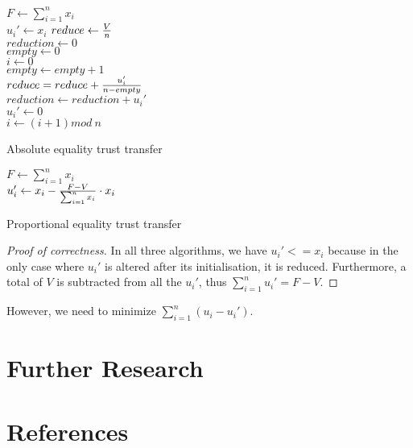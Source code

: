 \documentclass[11pt]{article}
\theoremstyle{definition}
\theoremstyle{corollary}
\begin{document}
    \begin{algorithm}[H]
       $F \gets \sum_{i=1}^{n}x_i$ \\
          {$u_i' \gets x_i$}
       $reduce \gets {V \over n}$ \\
       $reduction \gets 0$ \\
       $empty \gets 0$ \\
       $i \gets 0$ \\
          {
                {$empty \gets empty + 1$ \\
                 $reduce = reduce + {{u_i'} \over {n - empty}}$ \\
                 $reduction \gets reduction + u_i'$ \\
                 $u_i' \gets 0$ \\}
           $i \gets (i + 1) mod \:n$}
       \caption{Absolute equality trust transfer}
    \end{algorithm}

    \begin{algorithm}[H]
       $F \gets \sum_{i=1}^{n}x_i$ \\
          {$u_i' \gets x_i - {{F - V} \over {\sum_{i=1}^{n}x_i}} \cdot x_i$}
       \caption{Proportional equality trust transfer}
    \end{algorithm}
    \begin{proof}[Proof of correctness]
       In all three algorithms, we have $u_i' <= x_i$ because in the only case where $u_i'$ is altered after its
       initialisation, it is reduced. Furthermore, a total of $V$ is subtracted from all the $u_i'$, thus
       $\sum_{i=1}^{n}u_i' = F - V$.
    \end{proof}

    However, we need to minimize $\sum_{i=1}^{n}(u_i-u_i')$.

  \section{Further Research}

  \section{References}
\end{document}
